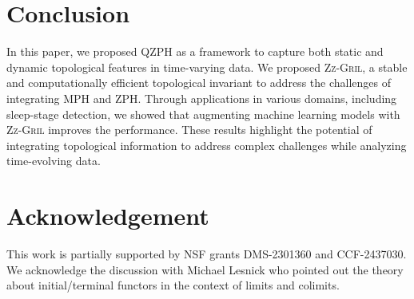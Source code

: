 \documentclass{article}
\newcommand{\zzgril}{\textsc{Zz-Gril}}
\theoremstyle{plain}
\theoremstyle{definition}
\theoremstyle{remark}
\begin{document}


\section{Conclusion}
In this paper, we proposed QZPH as a framework to capture both static and dynamic topological features in time-varying data. We proposed \zzgril{}, a stable and computationally efficient topological invariant to address the challenges of integrating MPH and ZPH. Through applications in various domains, including sleep-stage detection, we showed that augmenting machine learning models with \zzgril{} improves the performance. These results highlight the potential of integrating topological information to address complex challenges while analyzing time-evolving data. 


\section{Acknowledgement}
This work is partially supported by NSF grants DMS-2301360 and CCF-2437030. We acknowledge the discussion with Michael Lesnick who pointed out the theory
about initial/terminal functors in the context of limits and colimits.



\newpage






\end{document}
